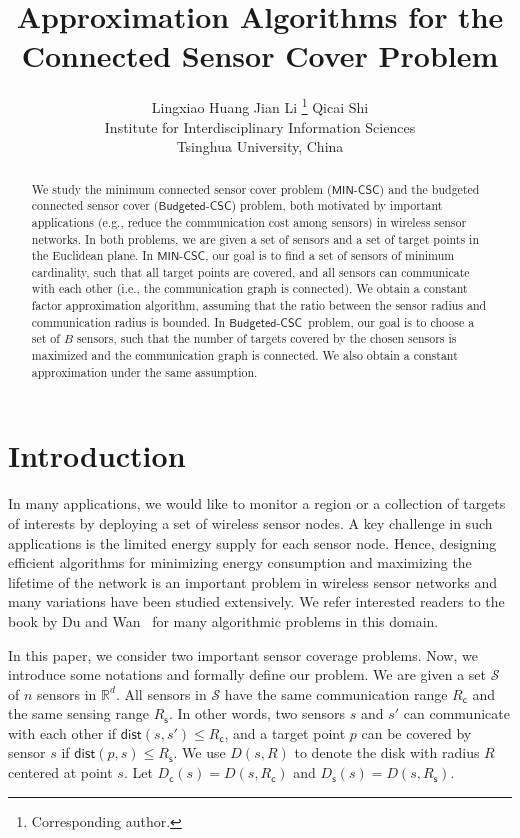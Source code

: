 \documentclass[11pt]{article}
\title{Approximation Algorithms for the Connected Sensor Cover Problem}
\author{Lingxiao Huang \quad\quad\quad\quad Jian Li \thanks{Corresponding author.}
	\quad \quad \quad \quad Qicai Shi  \\
Institute for Interdisciplinary Information Sciences\\
Tsinghua University, China \\
\mailsa
}
\newcommand{\calS}{{\mathcal S}}
\newcommand{\dist}{\mathsf{dist}}
\newcommand{\R}{\mathbb{R}}
\newcommand{\mincsc}{$\mathsf{MIN}$-$\mathsf{CSC}$}
\newcommand{\bcsc}{$\mathsf{Budgeted}$-$\mathsf{CSC}$}
\newcommand{\Rc}{R_\mathsf{c}}
\newcommand{\Rs}{R_\mathsf{s}}
\newcommand{\Dc}{D_\mathsf{c}}
\newcommand{\Ds}{D_\mathsf{s}}
\begin{document}
\maketitle

\begin{abstract}
	We study the minimum connected sensor cover problem  (\mincsc) and
	the budgeted connected sensor cover  (\bcsc) problem,
both motivated by important applications (e.g., reduce the communication cost among sensors) in wireless sensor networks.
In both problems, we are given a set of sensors and a set of target points in the Euclidean plane.
In \mincsc, our goal is to find a set of sensors of minimum cardinality,
such that all target points are covered, and all sensors can communicate with each other (i.e., the communication graph is  connected). We obtain a constant factor approximation algorithm, assuming that the ratio between the sensor radius and communication radius is bounded.
In \bcsc\ problem, our goal is to choose a set of $B$ sensors, such that the number of targets covered by the chosen sensors is maximized and the communication graph is connected. We also obtain a constant approximation under the same assumption.
\end{abstract}

\vspace{-0.2cm}
\section{Introduction}
\vspace{-0.2cm}

In many applications, we would like to monitor a region or a collection of targets of interests
by deploying a set of wireless sensor nodes.
A key challenge in such applications is the limited energy supply for each sensor node.
Hence, designing efficient algorithms for minimizing energy consumption and maximizing the lifetime of the network
is an important problem in wireless sensor networks and many variations have been studied extensively. We refer interested readers to the book by Du and Wan~\cite{du2012connected}
for many algorithmic problems in this domain.

In this paper, we consider two important sensor coverage problems.
Now, we introduce some notations and formally define our problem.
We are given a set $\calS$ of $n$ sensors in $\R^d$.
All sensors in $\calS$ have the same communication range $\Rc$
and the same sensing range $\Rs$.
In other words, two sensors $s$ and $s'$ can communicate with each other
if $\dist(s,s')\leq \Rc$, and a target point $p$ can be covered by sensor $s$
if $\dist(p,s)\leq \Rs$.
We use $D(s,R)$ to denote the disk with radius $R$ centered at point $s$.
Let $\Dc(s)=D(s,\Rc)$ and $\Ds(s)=D(s,\Rs)$.
\end{document}
